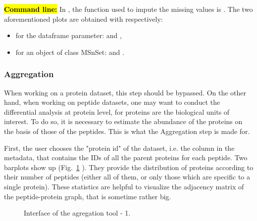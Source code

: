 \documentclass[12pt]{article}
\begin{document}
{\hl{\bf Command line:} In , the function used to impute the missing values is . The two aforementioned plots are obtained with respectively:
\begin{itemize}
\item for the dataframe parameter:  and ,
\item for an object of class MSnSet:  and .
\end{itemize}}

\subsubsection{Aggregation}\label{aggregation}


{When working on a protein dataset, this step should be bypassed. On the other hand, 
when working on peptide datasets, one may want to conduct the differential analysis at protein level, for proteins are the biological units of interest. To do so, it is necessary to estimate the abundance of the proteins on the basis of those of the peptides. This is what the Aggregation step is made for.}

{First, the user chooses the "protein id" of the dataset, i.e. the column in the metadata, that contains the IDs of all the parent proteins for each peptide. 
Two barplots show up (Fig.~\ref{fig:agreg1} ). They provide the distribution of proteins according to their number of peptides (either all of them, or only those which are specific to a single protein). These statistics are helpful to visualize the adjacency matrix of the peptide-protein graph, that is sometime rather big.}


\begin {figure}
\centering
{}
\caption{Interface of the agregation tool - 1.}\label{fig:agreg1}
\end {figure}
\end{document}
